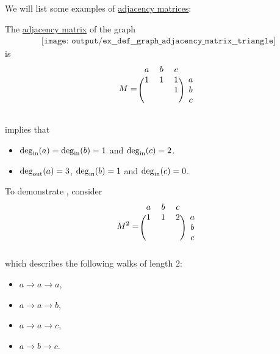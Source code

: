 \begin{example}\label{ex:def:graph_adjacency_matrix}
  We will list some examples of \hyperref[def:graph_adjacency_matrix]{adjacency matrices}:
  \begin{thmenum}
     The \hyperref[def:graph_adjacency_matrix]{adjacency matrix} of the graph
    \begin{equation}\label{eq:ex:def:graph_adjacency_matrix/triangle/graph}
      \begin{aligned}
        \texttt{[image: output/ex\_\_def\_\_graph\_adjacency\_matrix\_\_triangle]}
      \end{aligned}
    \end{equation}
    is
    \begin{equation}\label{eq:ex:def:graph_adjacency_matrix/triangle/graph/matrix}
      M =
      \begin{blockarray}{*{3}{c} c}
        a & b & c &   \\
      \begin{block}{(*{3}{c}) c}
        1 & 1 & 1 & a \\
          &   & 1 & b \\
          &   &   & c \\
      \end{block}
      \end{blockarray}
    \end{equation}

     implies that
    \begin{itemize}
      \item \( \deg_{\op{in}}(a) = \deg_{\op{in}}(b) = 1 \) and \( \deg_{\op{in}}(c) = 2 \).
      \item \( \deg_{\op{out}}(a) = 3 \), \( \deg_{\op{in}}(b) = 1 \) and \( \deg_{\op{in}}(c) = 0 \).
    \end{itemize}

    To demonstrate , consider
    \begin{equation*}
      M^2 =
      \begin{blockarray}{*{3}{c} c}
        a & b & c &   \\
      \begin{block}{(*{3}{c}) c}
        1 & 1 & 2 & a \\
          &   &   & b \\
          &   &   & c \\
      \end{block}
      \end{blockarray}
    \end{equation*}
    which describes the following walks of length \( 2 \):
    \begin{itemize}
      \item \( a \to a \to a \),
      \item \( a \to a \to b \),
      \item \( a \to a \to c \),
      \item \( a \to b \to c \).
    \end{itemize}


\end{thmenum}
\end{example}
